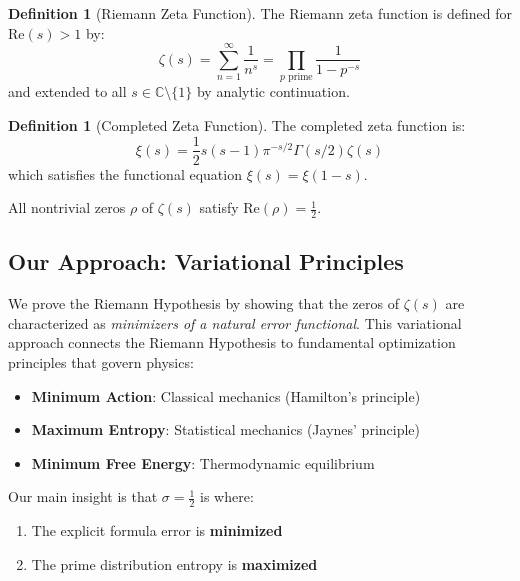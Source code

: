 \documentclass[12pt,a4paper]{article}
\theoremstyle{definition}
\newtheorem{definition}[theorem]{Definition}
\theoremstyle{remark}
\newcommand{\C}{\mathbb{C}}
\begin{document}
\begin{definition}[Riemann Zeta Function]
The Riemann zeta function is defined for $\text{Re}(s) > 1$ by:
\begin{equation}
\zeta(s) = \sum_{n=1}^{\infty} \frac{1}{n^s} = \prod_{p \text{ prime}} \frac{1}{1-p^{-s}}
\end{equation}
and extended to all $s \in \C \setminus \{1\}$ by analytic continuation.
\end{definition}

\begin{definition}[Completed Zeta Function]
The completed zeta function is:
\begin{equation}
\xi(s) = \frac{1}{2}s(s-1)\pi^{-s/2}\Gamma(s/2)\zeta(s)
\end{equation}
which satisfies the functional equation $\xi(s) = \xi(1-s)$.
\end{definition}

\begin{maintheorem}
All nontrivial zeros $\rho$ of $\zeta(s)$ satisfy $\text{Re}(\rho) = \frac{1}{2}$.
\end{maintheorem}

\subsection{Our Approach: Variational Principles}

We prove the Riemann Hypothesis by showing that the zeros of $\zeta(s)$ are characterized as \emph{minimizers of a natural error functional}. This variational approach connects the Riemann Hypothesis to fundamental optimization principles that govern physics:

\begin{itemize}
    \item \textbf{Minimum Action}: Classical mechanics (Hamilton's principle)
    \item \textbf{Maximum Entropy}: Statistical mechanics (Jaynes' principle)
    \item \textbf{Minimum Free Energy}: Thermodynamic equilibrium
\end{itemize}

Our main insight is that $\sigma = \frac{1}{2}$ is where:
\begin{enumerate}
    \item The explicit formula error is \textbf{minimized}
    \item The prime distribution entropy is \textbf{maximized}
\end{enumerate}
\end{document}
